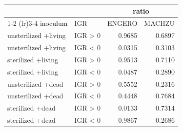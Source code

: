\begin{table}[t]
\fontsize{12.0pt}{14.4pt}\selectfont
\begin{tabular*}{\linewidth}{@{\extracolsep{\fill}}llrr}
\toprule
\multicolumn{2}{c}{  } & \multicolumn{2}{c}{ratio} \\ 
\cmidrule(lr){1-2} \cmidrule(lr){3-4}
inoculum & IGR & ENGERO & MACHZU \\ 
\midrule\addlinespace[2.5pt]
unsterilized
+living & IGR > 0 & 0.9685 & 0.6897 \\ 
unsterilized
+living & IGR < 0 & 0.0315 & 0.3103 \\ 
sterilized
+living & IGR > 0 & 0.9513 & 0.7110 \\ 
sterilized
+living & IGR < 0 & 0.0487 & 0.2890 \\ 
unsterilized
+dead & IGR > 0 & 0.5552 & 0.2316 \\ 
unsterilized
+dead & IGR < 0 & 0.4448 & 0.7684 \\ 
sterilized
+dead & IGR > 0 & 0.0133 & 0.7314 \\ 
sterilized
+dead & IGR < 0 & 0.9867 & 0.2686 \\ 
\bottomrule
\end{tabular*}
\end{table}

